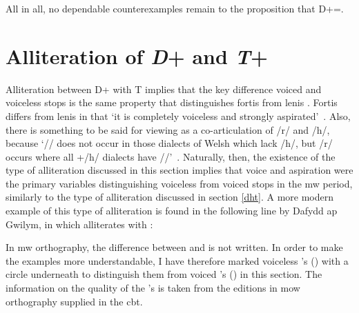 All in all, no dependable counterexamples remain to the proposition that \gls{D}+=\xT.
\section{Alliteration of \textit{D}+ and \textit{T}+}
\label{drhtr}
Alliteration between \gls{D}+ with \gls{T} implies that the key difference voiced and voiceless stops is the same property that distinguishes fortis  from lenis . Fortis  differs from lenis  in that `it is completely voiceless and strongly aspirated'~\parencite[50]{jones_distinctive_1984}. Also, there is something to be said for viewing  as a co-articulation of /r/ and /h/, because `/\rh/ does not occur in those dialects of Welsh which lack /h/, but /r/ occurs where all +/h/ dialects have /\rh/'~\parencite[50]{jones_distinctive_1984}. Naturally, then, the existence of the type of alliteration discussed in this section implies that voice and aspiration were the primary variables distinguishing voiceless from voiced stops in the \gls{mw} period, similarly to the type of alliteration discussed in section \ref{dht}. A more modern example of this type of alliteration is found in the following line by Dafydd ap Gwilym, in which  alliterates with :  

In \gls{mw} orthography, the difference between  and  is not written. In order to make the examples more understandable, I have therefore marked voiceless \mw{\rh}'s () with a circle underneath to distinguish them from voiced 's () in this section. The information on the quality of the 's is taken from the editions in \gls{mow} orthography supplied in the \gls{cbt}.
